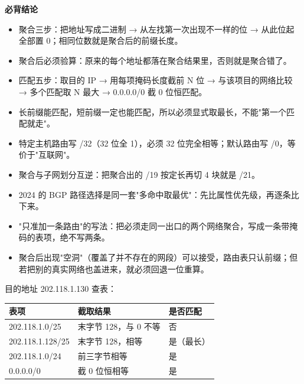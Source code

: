 \documentclass[10pt,a4paper]{ctexart}
\begin{document}

\textbf{必背结论}

\begin{itemize}

\item 聚合三步：把地址写成二进制 → 从左找第一次出现不一样的位 → 从此位起全部置 0；相同位数就是聚合后的前缀长度。

\item 聚合后必须验算：原来的每个地址都落在聚合结果里，否则就是聚合错了。

\item 匹配五步：取目的 IP → 用每项掩码长度截前 N 位 → 与该项目的网络比较 → 多个匹配取 N 最大 → 0.0.0.0/0 截 0 位恒匹配。

\item 长前缀能匹配，短前缀一定也能匹配，所以必须显式取最长，不能"第一个匹配就走"。

\item 特定主机路由写 /32（32 位全 1），必须 32 位完全相等；默认路由写 /0，等价于"互联网"。

\item 聚合与子网划分互逆：把聚合出的 /19 按定长再切 4 块就是 /21。

\item 2024 的 BGP 路径选择是同一套"多命中取最优"：先比属性优先级，再逐条比下来。

\item "只准加一条路由"的写法：把必须走同一出口的两个网络聚合，写成一条带掩码的表项，绝不写两条。

\item 聚合后出现"空洞"（覆盖了并不存在的网段）可以接受，路由表只认前缀；但若把别的真实网络也盖进来，就必须回退一位重算。

\end{itemize}

目的地址 202.118.1.130 查表：

\begin{center}\small
\begin{tabularx}{\linewidth}{@{}l>{\raggedright\arraybackslash}Xl@{}}
\toprule
表项 & 截取结果 & 是否匹配 \\
\midrule
202.118.1.0/25 & 末字节 128，与 0 不等 & 否 \\
202.118.1.128/25 & 末字节 128，相等 & 是（最长） \\
202.118.1.0/24 & 前三字节相等 & 是 \\
0.0.0.0/0 & 截 0 位恒相等 & 是 \\
\bottomrule
\end{tabularx}
\end{center}
\end{document}
